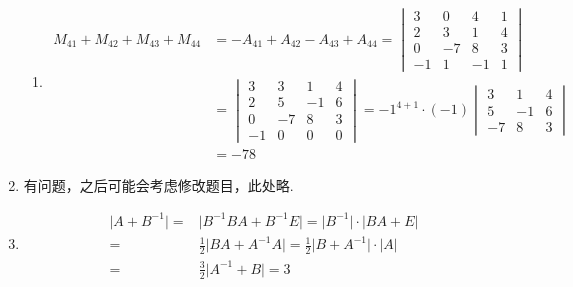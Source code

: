 \begin{enumerate}
\begin{enumerate}
              \item \begin{align*}
                        M_{41}+M_{42}+M_{43}+M_{44}
                         & = -A_{41}+A_{42}-A_{43}+A_{44}
                        = \begin{vmatrix}
                              3  & 0  & 4  & 1 \\
                              2  & 3  & 1  & 4 \\
                              0  & -7 & 8  & 3 \\
                              -1 & 1  & -1 & 1
                          \end{vmatrix}                  \\
                         & = \begin{vmatrix}
                                 3  & 3  & 1  & 4 \\
                                 2  & 5  & -1 & 6 \\
                                 0  & -7 & 8  & 3 \\
                                 -1 & 0  & 0  & 0
                             \end{vmatrix}
                        = {-1}^{4+1} \cdot (-1) \begin{vmatrix}
                                                    3  & 1  & 4 \\
                                                    5  & -1 & 6 \\
                                                    -7 & 8  & 3
                                                \end{vmatrix} \\
                         & = -78
                    \end{align*}
          \end{enumerate}

    \item 有问题，之后可能会考虑修改题目，此处略.

    \item \begin{align*}
              \lvert A+B^{-1} \rvert ={} & \lvert B^{-1}BA+B^{-1}E \rvert = \lvert B^{-1} \rvert \cdot \lvert BA+E \rvert                  \\
              ={}                        & \frac{1}{2} \lvert BA+A^{-1}A \rvert = \frac{1}{2} \lvert B+A^{-1} \rvert \cdot \lvert A \rvert \\
              ={}                        & \frac{3}{2} \lvert A^{-1}+B \rvert = 3
          \end{align*}


\end{enumerate}
